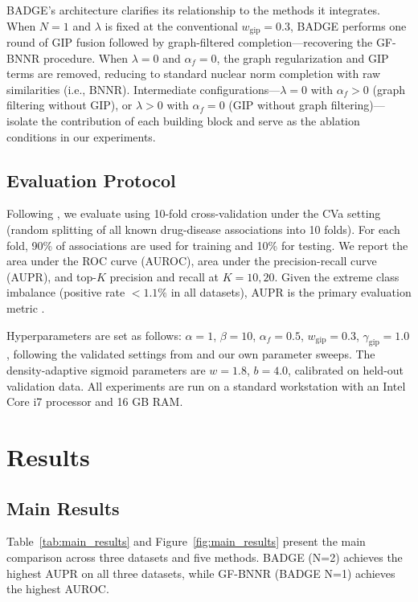 \documentclass{oup-authoring-template}
\begin{document}
BADGE's architecture clarifies its relationship to the methods it integrates. When $N=1$ and $\lambda$ is fixed at the conventional $w_{\text{gip}}=0.3$, BADGE performs one round of GIP fusion followed by graph-filtered completion---recovering the GF-BNNR procedure. When $\lambda=0$ and $\alpha_f=0$, the graph regularization and GIP terms are removed, reducing to standard nuclear norm completion with raw similarities (i.e., BNNR). Intermediate configurations---$\lambda=0$ with $\alpha_f>0$ (graph filtering without GIP), or $\lambda>0$ with $\alpha_f=0$ (GIP without graph filtering)---isolate the contribution of each building block and serve as the ablation conditions in our experiments.

\subsection{Evaluation Protocol}

Following \cite{yang2019,gao2023}, we evaluate using 10-fold cross-validation under the CVa setting (random splitting of all known drug-disease associations into 10 folds). For each fold, 90\% of associations are used for training and 10\% for testing. We report the area under the ROC curve (AUROC), area under the precision-recall curve (AUPR), and top-$K$ precision and recall at $K=10, 20$. Given the extreme class imbalance (positive rate $< 1.1\%$ in all datasets), AUPR is the primary evaluation metric \cite{saito2015}.

Hyperparameters are set as follows: $\alpha = 1$, $\beta = 10$, $\alpha_f = 0.5$, $w_{\text{gip}} = 0.3$, $\gamma_{\text{gip}} = 1.0$, following the validated settings from \cite{yang2019} and our own parameter sweeps. The density-adaptive sigmoid parameters are $w = 1.8$, $b = 4.0$, calibrated on held-out validation data. All experiments are run on a standard workstation with an Intel Core i7 processor and 16 GB RAM.

\section{Results}

\subsection{Main Results}

Table~\ref{tab:main_results} and Figure~\ref{fig:main_results} present the main comparison across three datasets and five methods. BADGE (N=2) achieves the highest AUPR on all three datasets, while GF-BNNR (BADGE N=1) achieves the highest AUROC.
\end{document}
